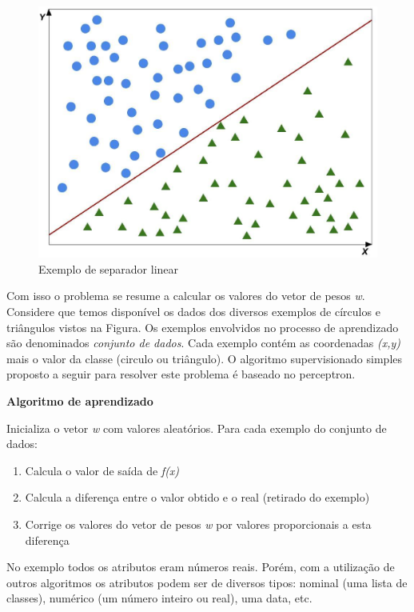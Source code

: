\begin{figure}[h!]
  \includegraphics[width=\linewidth]{images/conceitosbasicos02.eps}
  \caption{Exemplo de separador linear}
  \label{fig:conceitosbasicos02}
\end{figure}

Com isso o problema se resume a calcular os valores do vetor de pesos \textit{w}.
Considere que temos disponível os dados dos diversos exemplos de círculos e triângulos vistos na Figura.
Os exemplos envolvidos no processo de aprendizado são denominados \textit{conjunto de dados}.
Cada exemplo contém as coordenadas \textit{(x,y)} mais o valor da classe (circulo ou triângulo).
O algoritmo supervisionado simples proposto a seguir para resolver este problema é baseado no perceptron.
\\

\hline
\begin{center}
\textbf{Algoritmo de aprendizado}
\end{center}
\hline
\hfill \break
Inicializa o vetor \textit{w} com valores aleatórios.
Para cada exemplo do conjunto de dados:
\begin{enumerate}
\item Calcula o valor de saída de \textit{f(x)}
\item Calcula a diferença entre o valor obtido e o real (retirado do exemplo) 
\item Corrige os valores do vetor de pesos \textit{w} por valores proporcionais a esta diferença
\end{enumerate}
\hline
\hfill \break

No exemplo todos os atributos eram números reais.
Porém, com a utilização de outros algoritmos os atributos podem ser de diversos tipos: nominal (uma lista de classes), numérico (um número inteiro ou real), uma data, etc.

